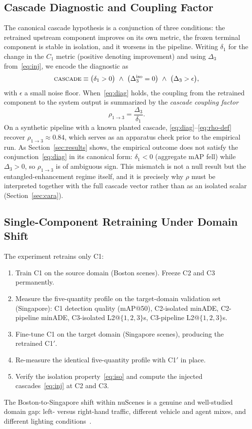 \documentclass[conference]{IEEEtran}
\begin{document}
\subsection{Cascade Diagnostic and Coupling Factor}
\label{sec:diag}
The canonical cascade hypothesis is a conjunction of three conditions: the
retrained upstream component improves on its own metric, the frozen terminal
component is stable in isolation, and it worsens in the pipeline. Writing
$\delta_1$ for the change in the $C_1$ metric (positive denoting improvement)
and using $\Delta_3$ from~\eqref{eq:inj}, we encode the diagnostic as
\begin{equation}
\textsc{cascade} \equiv
\bigl(\delta_1 > 0\bigr)
\ \wedge\
\bigl(\Delta_3^{\text{iso}} = 0\bigr)
\ \wedge\
\bigl(\Delta_3 > \epsilon\bigr),
\label{eq:diag}
\end{equation}
with $\epsilon$ a small noise floor. When~\eqref{eq:diag} holds, the
coupling from the retrained component to the system output is summarized by
the \emph{cascade coupling factor}
\begin{equation}
\rho_{1\to 3} = \frac{\Delta_3}{\delta_1}.
\label{eq:rho-def}
\end{equation}
On a synthetic pipeline with a known planted cascade,
\eqref{eq:diag}--\eqref{eq:rho-def} recover $\rho_{1\to 3} \approx 0.84$, which
serves as an apparatus check prior to the empirical run. As
Section~\ref{sec:results} shows, the empirical outcome does not satisfy the
conjunction~\eqref{eq:diag} in its canonical form: $\delta_1 < 0$ (aggregate
mAP fell) while $\Delta_3 > 0$, so $\rho_{1\to 3}$ is of ambiguous sign. This
mismatch is not a null result but the entangled-enhancement regime itself, and
it is precisely why $\rho$ must be interpreted together with the full cascade
vector rather than as an isolated scalar (Section~\ref{sec:cara}).

\subsection{Single-Component Retraining Under Domain Shift}
\label{sec:experiment}
The experiment retrains only C1:
\begin{enumerate}
\item Train C1 on the source domain (Boston scenes). Freeze C2 and C3
permanently.
\item Measure the five-quantity profile on the target-domain validation set
(Singapore): C1 detection quality (mAP@50), C2-isolated minADE, C2-pipeline
minADE, C3-isolated L2@$\{1,2,3\}$s, C3-pipeline L2@$\{1,2,3\}$s.
\item Fine-tune C1 on the target domain (Singapore scenes), producing the
retrained C1$'$.
\item Re-measure the identical five-quantity profile with C1$'$ in place.
\item Verify the isolation property~\eqref{eq:iso} and compute the injected
cascades~\eqref{eq:inj} at C2 and C3.
\end{enumerate}
The Boston-to-Singapore shift within nuScenes is a genuine and well-studied
domain gap: left- versus right-hand traffic, different vehicle and agent
mixes, and different lighting conditions~\cite{caesar2020nuscenes}.
\end{document}
